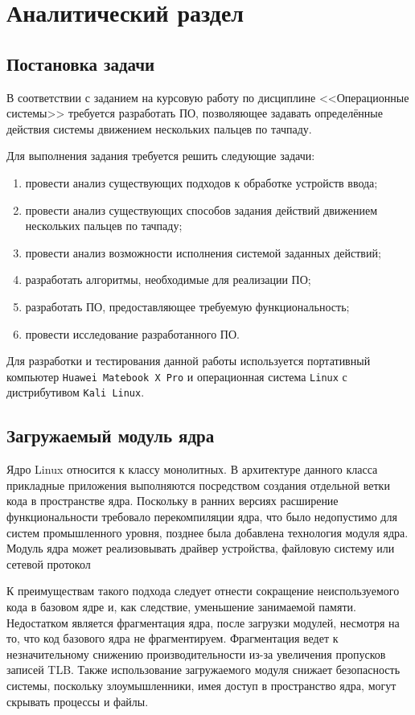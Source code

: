\section{Аналитический раздел}
\subsection{Постановка задачи}
В соответствии с заданием на курсовую работу по дисциплине <<Операционные системы>> требуется разработать ПО, позволяющее задавать определённые действия системы движением нескольких пальцев по тачпаду.

Для выполнения задания требуется решить следующие задачи:
\begin{enumerate}
	\item провести анализ существующих подходов к обработке устройств ввода;
	\item провести анализ существующих способов задания действий движением нескольких пальцев по тачпаду;
	\item провести анализ возможности исполнения системой заданных действий;
	\item разработать алгоритмы, необходимые для реализации ПО;
	\item разработать ПО, предоставляющее требуемую функциональность;
	\item провести исследование разработанного ПО.
\end{enumerate}

Для разработки и тестирования данной работы используется портативный компьютер \texttt{Huawei Matebook X Pro} и операционная система \texttt{Linux} с дистрибутивом \texttt{Kali Linux}.

\subsection{Загружаемый модуль ядра}

Ядро Linux относится к классу монолитных. В архитектуре данного класса прикладные приложения выполняются посредством создания отдельной ветки кода в пространстве ядра. Поскольку в ранних версиях расширение функциональности требовало перекомпиляции ядра, что было недопустимо для систем промышленного уровня, позднее была добавлена технология модуля ядра. Модуль ядра может реализовывать драйвер устройства, файловую систему или сетевой протокол

К преимуществам такого подхода следует отнести сокращение неиспользуемого кода в базовом ядре и, как следствие, уменьшение занимаемой памяти. Недостатком является фрагментация ядра, после загрузки
модулей, несмотря на то, что код базового ядра не фрагментируем. Фрагментация ведет к незначительному снижению производительности из-за
увеличения пропусков записей TLB. Также использование загружаемого модуля снижает безопасность системы, поскольку злоумышленники, имея
доступ в пространство ядра, могут скрывать процессы и файлы.


